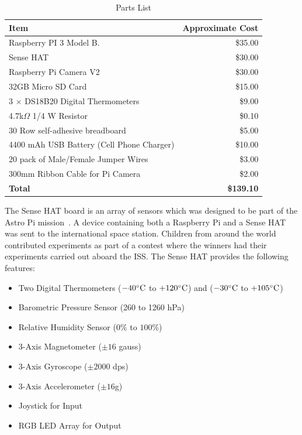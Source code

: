 \documentclass[journal]{new-aiaa}
\begin{document}
\begin{table}
    \begin{center}
    \begin{tabular}{l|r}
        {\bf Item} & {\bf Approximate Cost}\\
        \hline
        Raspberry PI 3 Model B. & \$35.00\\
        Sense HAT & \$30.00\\
        Raspberry Pi Camera V2& \$30.00\\
        32GB Micro SD Card & \$15.00\\
        3 $\times$ DS18B20 Digital Thermometers & \$9.00\\
        4.7k$\Omega$ 1/4 W Resistor & \$0.10\\
        30 Row self-adhesive breadboard & \$5.00\\
        4400 mAh USB Battery (Cell Phone Charger) & \$10.00\\ 
        20 pack of Male/Female Jumper Wires & \$3.00\\
        300mm Ribbon Cable for Pi Camera & \$2.00\\
        \hline
        {\bf Total} & {\bf\$139.10} \\
    \end{tabular}
    \caption{Parts List}
    \label{tab:parts}
    \end{center}
\end{table}

The Sense HAT board is an array of sensors which was designed to be
part of the Astro Pi mission~\cite{MagpiSenseHat}.  
A device containing both a Raspberry Pi and a Sense HAT was sent to
the international space station.  Children from around the world
contributed experiments as part of a contest where the winners had
their experiments carried out aboard the ISS.  The Sense HAT provides
the following features:
\begin{itemize}
    \item Two Digital Thermometers ($-40 \celsius$ to $+120 \celsius$)
    \cite{HTS221} and ($-30 \celsius$ to $+105 \celsius$)\cite{LPS25H}
    \item Barometric Pressure Sensor (260 to 1260 hPa) ~\cite{LPS25H}
    \item Relative Humidity Sensor ($0\%$ to $100\%$)~\cite{HTS221}
    \item 3-Axis Magnetometer ($\pm 16$ gauss)~\cite{LSM9DS1}
    \item 3-Axis Gyroscope ($\pm 2000$ dps)~\cite{LSM9DS1}
    \item 3-Axis Accelerometer ($\pm 16$g)~\cite{LSM9DS1}
    \item Joystick for Input
    \item RGB LED Array for Output
\end{itemize}
\end{document}
